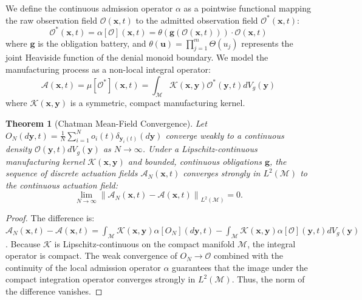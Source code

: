 \documentclass[11pt,oneside]{book}
\theoremstyle{definition}
\theoremstyle{plain}
\newtheorem{theorem}{Theorem}[chapter]
\theoremstyle{remark}
\begin{document}
We define the continuous admission operator $\alpha$ as a pointwise functional mapping the raw observation field $\mathcal{O}(\mathbf{x}, t)$ to the admitted observation field $\mathcal{O}^*(\mathbf{x}, t)$:
\[
\mathcal{O}^*(\mathbf{x}, t) = \alpha[\mathcal{O}](\mathbf{x}, t) = \theta\left( \mathbf{g}(\mathcal{O}(\mathbf{x}, t)) \right) \cdot \mathcal{O}(\mathbf{x}, t)
\]
where $\mathbf{g}$ is the obligation battery, and $\theta(\mathbf{u}) = \prod_{j=1}^m \Theta(u_j)$ represents the joint Heaviside function of the denial monoid boundary. %
We model the manufacturing process as a non-local integral operator:
\[
\mathcal{A}(\mathbf{x}, t) = \mu[\mathcal{O}^*](\mathbf{x}, t) = \int_{\mathcal{M}} \mathcal{K}(\mathbf{x}, \mathbf{y}) \mathcal{O}^*(\mathbf{y}, t) dV_g(\mathbf{y})
\]
where $\mathcal{K}(\mathbf{x}, \mathbf{y})$ is a symmetric, compact manufacturing kernel. %

\begin{theorem}[Chatman Mean-Field Convergence]\label{thm:mean_field}
Let $O_N(d\mathbf{y}, t) = \frac{1}{N} \sum_{i=1}^N o_i(t) \delta_{\mathbf{y}_i(t)}(d\mathbf{y})$ converge weakly to a continuous density $\mathcal{O}(\mathbf{y}, t) dV_g(\mathbf{y})$ as $N \to \infty$. %
Under a Lipschitz-continuous manufacturing kernel $\mathcal{K}(\mathbf{x}, \mathbf{y})$ and bounded, continuous obligations $\mathbf{g}$, the sequence of discrete actuation fields $\mathcal{A}_N(\mathbf{x}, t)$ converges strongly in $L^2(\mathcal{M})$ to the continuous actuation field:
\[
\lim_{N \to \infty} \left\| \mathcal{A}_N(\mathbf{x}, t) - \mathcal{A}(\mathbf{x}, t) \right\|_{L^2(\mathcal{M})} = 0.
\]
\end{theorem}

\begin{proof}
The difference is: $\mathcal{A}_N(\mathbf{x}, t) - \mathcal{A}(\mathbf{x}, t) = \int_{\mathcal{M}} \mathcal{K}(\mathbf{x}, \mathbf{y}) \alpha[O_N](d\mathbf{y}, t) - \int_{\mathcal{M}} \mathcal{K}(\mathbf{x}, \mathbf{y}) \alpha[\mathcal{O}](\mathbf{y}, t) dV_g(\mathbf{y})$. %
Because $\mathcal{K}$ is Lipschitz-continuous on the compact manifold $\mathcal{M}$, the integral operator is compact. %
The weak convergence of $O_N \to \mathcal{O}$ combined with the continuity of the local admission operator $\alpha$ guarantees that the image under the compact integration operator converges strongly in $L^2(\mathcal{M})$. %
Thus, the norm of the difference vanishes. %
\end{proof}
\end{document}
